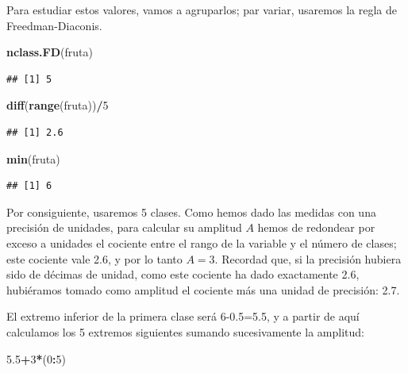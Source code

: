\documentclass[]{book}
\newenvironment{Shaded}{\begin{snugshade}}{\end{snugshade}}
\newcommand{\DecValTok}[1]{\textcolor[rgb]{0.00,0.00,0.81}{#1}}
\newcommand{\FloatTok}[1]{\textcolor[rgb]{0.00,0.00,0.81}{#1}}
\newcommand{\KeywordTok}[1]{\textcolor[rgb]{0.13,0.29,0.53}{\textbf{#1}}}
\newcommand{\NormalTok}[1]{#1}
\newcommand{\OperatorTok}[1]{\textcolor[rgb]{0.81,0.36,0.00}{\textbf{#1}}}
\theoremstyle{definition}
\theoremstyle{definition}
\theoremstyle{definition}
\theoremstyle{remark}
\begin{document}
Para estudiar estos valores, vamos a agruparlos; par variar, usaremos la regla de Freedman-Diaconis.

\begin{Shaded}
\begin{Highlighting}[]
\KeywordTok{nclass.FD}\NormalTok{(fruta)}
\end{Highlighting}
\end{Shaded}

\begin{verbatim}
## [1] 5
\end{verbatim}

\begin{Shaded}
\begin{Highlighting}[]
\KeywordTok{diff}\NormalTok{(}\KeywordTok{range}\NormalTok{(fruta))}\OperatorTok{/}\DecValTok{5}
\end{Highlighting}
\end{Shaded}

\begin{verbatim}
## [1] 2.6
\end{verbatim}

\begin{Shaded}
\begin{Highlighting}[]
\KeywordTok{min}\NormalTok{(fruta)}
\end{Highlighting}
\end{Shaded}

\begin{verbatim}
## [1] 6
\end{verbatim}

Por consiguiente, usaremos 5 clases. Como hemos dado las medidas con una precisión de unidades,
para calcular su amplitud \(A\) hemos de redondear por exceso a unidades el cociente entre el rango de la variable y el número de clases; este cociente vale 2.6, y por lo tanto \(A=3\). Recordad que, si la precisión hubiera sido de décimas de unidad, como este cociente ha dado exactamente 2.6, hubiéramos tomado como amplitud el cociente más una unidad de precisión: 2.7.

El extremo inferior de la primera clase será 6-0.5=5.5, y a partir de aquí calculamos los 5 extremos siguientes sumando sucesivamente la amplitud:

\begin{Shaded}
\begin{Highlighting}[]
\FloatTok{5.5}\OperatorTok{+}\DecValTok{3}\OperatorTok{*}\NormalTok{(}\DecValTok{0}\OperatorTok{:}\DecValTok{5}\NormalTok{)}
\end{Highlighting}
\end{Shaded}
\end{document}
